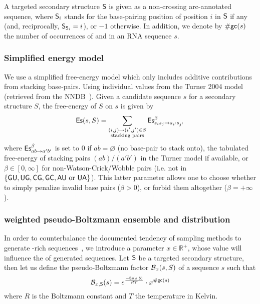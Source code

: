 A targeted secondary structure $\text{\sf S}$ is given as a non-crossing arc-annotated sequence,  where 
$\text{\sf S}_i$ stands for the base-pairing position of position $i$ in $\text{\sf S}$ if any (and, reciprocally, $\text{\sf S}_{\text{\sf S}_i}=i$), or $-1$ otherwise. 
In addition, we denote by ${\#\text{{\sf gc}}}(s)$ the number of occurrences of \Gb and \Cb in an RNA sequence $s$.

\subsubsection{Simplified energy model}
We use a simplified free-energy model which only includes additive contributions from stacking base-pairs. Using individual values from the Turner 2004 model (retrieved from the NNDB~\cite{Turner2010}). Given a candidate sequence $s$ for a secondary structure $S$, the free-energy of $S$ on $s$ is given by
\begin{align*}
  \text{{\sf Es}}(s,S) = \sum_{\substack{(i,j)\to (i',j')\in S\\ \text{stacking pairs}}}\text{{\sf Es}}^{\beta}_{s_is_j\to s_{i'}s_{j'}} 
\end{align*}
where $\text{{\sf Es}}^{\beta}_{ab\to a'b'}$ is set to $0$ if $ab=\varnothing$ (no base-pair to stack onto), the tabulated free-energy of stacking pairs $(ab)/(a'b')$ in the Turner model if available, or $\beta\in[0,\infty]$ for non-Watson-Crick/Wobble pairs (i.e. not in $\{{\sf{G}}{\sf{U}},{\sf{U}}{\sf{G}},{\sf{C}}{\sf{G}},{\sf{G}}{\sf{C}}, {\sf{A}}{\sf{U}}\text{ or }{\sf{U}}{\sf{A}}\}$). This latter parameter allows one to choose whether to simply penalize invalid base pairs ($\beta>0$), or forbid them altogether ($\beta = +\infty$).

\subsubsection{\GCContent weighted pseudo-Boltzmann ensemble and distribution}

In order to counterbalance the documented tendency of sampling methods to generate \Gb\Cb-rich sequences~\cite{Levin:2012kx}, we introduce a parameter $x\in\mathbb{R}^+$, whose value will influence the \GCContent of generated sequences. Let $\text{\sf S}$ be a targeted secondary structure, then let us define the pseudo-Boltzmann factor $\mathcal{B}_{x}(s,S)$ of a sequence $s$ such that
\begin{equation}
\mathcal{B}_{x, \text{\sf S}}(s) = e^{\frac{-\text{{\sf Es}}(s,\text{\sf S})}{RT}}\cdot x^{{\#\text{{\sf gc}}}(s)}
\label{def:genBoltz}
\end{equation}
where $R$ is the Boltzmann constant and $T$ the temperature in Kelvin.

